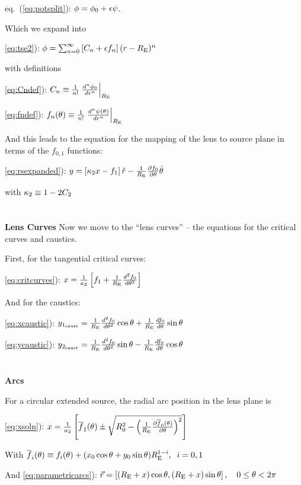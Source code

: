 eq.~(\ref{eq:potsplit}): $\phi  =  \phi_0 + \epsilon \psi$.

Which we expand into

\eqref{eq:tse2}): $\phi  = \sum_{n=0}^\infty \left[ C_n + \epsilon f_n  \right] (r-R_{\mathrm{E}})^n$

with definitions

\eqref{eq:Cndef}): $C_n \equiv {1 \over n!} \left. {d^n \phi_0 \over dr^n }\right|_{R_{\mathrm{E}}}$

\eqref{eq:fndef}): $f_n(\theta) \equiv  {1 \over n!} \left. {d^n \psi(\theta) \over dr^n }\right|_{R_{\mathrm{E}}}$

And this leads to the equation for the mapping of the lens to source plane in terms of the $f_{0,1}$ functions:

\eqref{eq:rsexpanded}):  $y = \left[ \kappa_2 x - f_1 \right] \hat{r} - {1 \over R_{\mathrm{E}}} {\partial f_0 \over \partial \theta}  \hat{\theta}$

with  $\kappa_2 \equiv 1-2 C_2$
\\
\\
\\
{\bf Lens Curves}
Now we move to the ``lens curves'' -- the equations for the critical curves and caustics.

First, for the tangential critical curves:

\eqref{eq:critcurves}): $x=\frac{1}{\kappa_2}\left[f_1+\frac{1}{R_{\mathrm{E}}}\frac{d^2f_0}{d\theta^2}\right] \label{xte}$

And for the caustics:

\eqref{eq:xcaustic}): $y_{1_\mathrm{caust}} = \frac{1}{R_{\mathrm{E}}}\frac{d^2f_0}{d\theta^2}\cos{\theta}+\frac{1}{R_{\mathrm{E}}}\frac{df_0}{d\theta}\sin{\theta}$

\eqref{eq:ycaustic}): $y_{2_\mathrm{caust}} = \frac{1}{R_{\mathrm{E}}}\frac{d^2f_0}{d\theta^2}\sin{\theta}-\frac{1}{R_{\mathrm{E}}}\frac{df_0}{d\theta}\cos{\theta}$
\\
\\
\\
{\bf Arcs}

For a circular extended source, the radial arc position in the lens plane is

\eqref{eq:xsoln}):  $x = \frac{1}{\kappa_2}\left[ \overline{f}_{1}(\theta) \pm \sqrt{R_0^2 - \left( \frac{1}{R_{\mathrm{E}}}\frac{\partial \overline{f}_0(\theta)}{\partial \theta} \right)^2} \right] $

With $\overline{f}_i(\theta) \equiv f_i(\theta) + (x_0 \cos \theta + y_0 \sin \theta)R_{\mathrm{E}}^{1-i}, \;\; i=0,1 $

And
\eqref{eq:parametricarcs}): $\vec{r}= \left[(R_{\mathrm{E}} +x)\cos{\theta},(R_{\mathrm{E}}+x)\sin{\theta}\right], \quad 0 \leq \theta < 2\pi$

